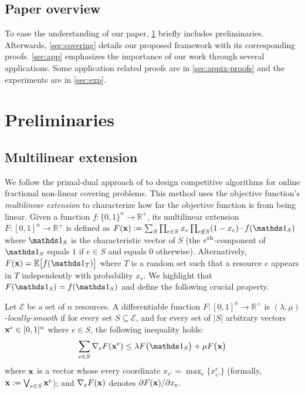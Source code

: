 \subsection{Paper overview}

To ease the understanding of our paper, \cref{sec-prelim} briefly includes preliminaries. Afterwards, \cref{sec:covering} details our proposed framework with its corresponding proofs. \cref{sec:app} emphasizes the importance of our work through several applications. Some application related proofs are in \cref{sec:appix-proofs} and the experiments are in \cref{sec:exp}.


\section{Preliminaries} \label{sec-prelim}

\subsection{Multilinear extension}

We follow the primal-dual approach of \cite{Thang20:Online-Primal-Dual} to design competitive algorithms for online fractional non-linear covering problems. This method uses the objective function's \emph{multilinear extension} to characterize how far the objective function is from being linear. Given a function $f: \{0,1\}^{n} \rightarrow \mathbb{R}^{+}$, its multilinear extension $F: [0,1]^{n} \rightarrow \mathbb{R}^{+}$
is defined as $F(\vect{x}) := \sum_{S} \prod_{e \in S} x_{e} \prod_{e \notin S} (1 - x_{e}) \cdot f(\one_{S})$
where $\one_{S}$ is the characteristic vector of $S$ (the $e^{\textnormal{th}}$-component of
$\one_{S}$ equals $1$ if $e \in S$ and equals 0 otherwise).
Alternatively, $F(\vect{x}) = \mathbb{E} \bigl[ f(\one_{T})\bigr]$ where $T$ is a random set
such that a resource $e$ appears in $T$ independently with probability $x_{e}$. We highlight that $F(\one_{S}) = f(\one_{S})$ and define the following crucial property.


\begin{definition}	\label{def:min-local-smooth}
Let $\mathcal{E}$ be a set of $n$ resources.
A differentiable function $F: [0,1]^{n} \rightarrow \mathbb{R}^{+}$ is $(\lambda,\mu)$-\emph{locally-smooth}
if for every set $S \subseteq \mathcal{E}$, and for every set of $|S|$ arbitrary vectors $\mathbf{x}^{e} \in [0,1]^{n}$ where $e \in S$, the following inequality holds:
\begin{equation*}	\label{eq:min-local-smooth}
\sum_{e \in S} \nabla_{e} F(\vect{x}^{e}) \leq \lambda F\bigl( \one_{S} \bigr) + \mu F\bigl( \vect{x} \bigr)
\end{equation*}
where $\mathbf{x}$ is a vector whose every coordinate $x_{e'} = \max_{e}\{x^{e}_{e'}\}$ (formally, $\mathbf{x} := \bigvee_{e \in S} \mathbf{x}^{e}$);
and $\nabla_{e} F(\mathbf{x})$ denotes $\partial F(\mathbf{x})/\partial x_{e}$.
\end{definition}

